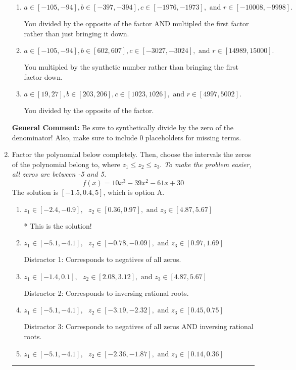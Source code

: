 \documentclass{extbook}[14pt]
\newcommand{\litem}[1]{\item #1

\rule{\textwidth}{0.4pt}}
\begin{document}
\begin{enumerate}
{\begin{enumerate}[label=\Alph*.]
* This is the solution!
\item \( a \in [-105, -94], b \in [-397, -394], c \in [-1976, -1973], \text{ and } r \in [-10008, -9998]. \)

 You divided by the opposite of the factor AND multipled the first factor rather than just bringing it down.
\item \( a \in [-105, -94], b \in [602, 607], c \in [-3027, -3024], \text{ and } r \in [14989, 15000]. \)

 You multipled by the synthetic number rather than bringing the first factor down.
\item \( a \in [19, 27], b \in [203, 206], c \in [1023, 1026], \text{ and } r \in [4997, 5002]. \)

 You divided by the opposite of the factor.
\end{enumerate}

\textbf{General Comment:} Be sure to synthetically divide by the zero of the denominator! Also, make sure to include 0 placeholders for missing terms.
}
\litem{
Factor the polynomial below completely. Then, choose the intervals the zeros of the polynomial belong to, where $z_1 \leq z_2 \leq z_3$. \textit{To make the problem easier, all zeros are between -5 and 5.}
\[ f(x) = 10x^{3} -39 x^{2} -61 x + 30 \]The solution is \( [-1.5, 0.4, 5] \), which is option A.\begin{enumerate}[label=\Alph*.]
\item \( z_1 \in [-2.4, -0.9], \text{   }  z_2 \in [0.36, 0.97], \text{   and   } z_3 \in [4.87, 5.67] \)

* This is the solution!
\item \( z_1 \in [-5.1, -4.1], \text{   }  z_2 \in [-0.78, -0.09], \text{   and   } z_3 \in [0.97, 1.69] \)

 Distractor 1: Corresponds to negatives of all zeros.
\item \( z_1 \in [-1.4, 0.1], \text{   }  z_2 \in [2.08, 3.12], \text{   and   } z_3 \in [4.87, 5.67] \)

 Distractor 2: Corresponds to inversing rational roots.
\item \( z_1 \in [-5.1, -4.1], \text{   }  z_2 \in [-3.19, -2.32], \text{   and   } z_3 \in [0.45, 0.75] \)

 Distractor 3: Corresponds to negatives of all zeros AND inversing rational roots.
\item \( z_1 \in [-5.1, -4.1], \text{   }  z_2 \in [-2.36, -1.87], \text{   and   } z_3 \in [0.14, 0.36] \)


\end{enumerate}}
\end{enumerate}
\end{document}
